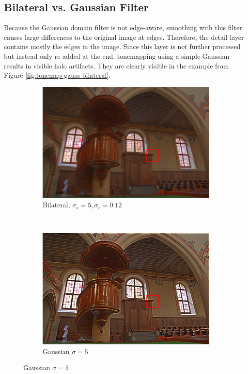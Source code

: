 \documentclass[a4spaper]{article}
\begin{document}
\subsection*{Bilateral vs. Gaussian Filter}
Because the Gaussian domain filter is not edge-aware, smoothing with this filter causes large differences to the original image at edges. Therefore, the detail layer contains mostly the edges in the image. Since this layer is not further processed but instead only re-added at the end, tonemapping using a simple Gaussian results in visible halo artifacts. They are clearly visible in the example from Figure \ref{fig:tonemap-gauss-bilateral}.
\begin{figure}[ht]
	\centering
	\begin{subfigure}[h]{0.48\textwidth}
		\centering
		\includegraphics[width=\textwidth]{tonemap_bilateral_5_0-12_200}
		\caption*{Bilateral, $\sigma_s = 5, \sigma_r = 0.12$}
	\end{subfigure}
	~ 
	\begin{subfigure}[h]{0.48\textwidth}
		\centering
		\includegraphics[width=\textwidth]{tonemap_gaussian_5_10}
		\caption*{Gaussian $\sigma = 5$}
	\end{subfigure}	
	

\end{figure}
\end{document}
